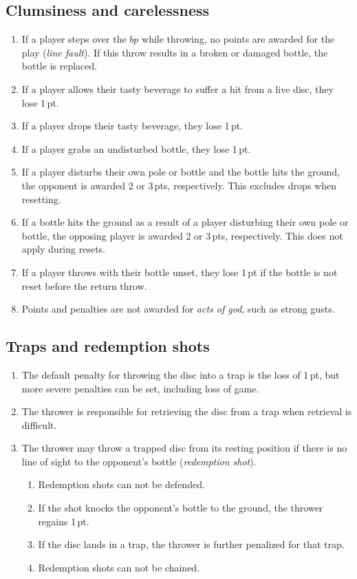 \documentclass[11pt,letterpaper,twocolumn,english,DIV=calc]{scrartcl}
\begin{document}
\subsection{\label{subsec:clumsiness-and-carelessness}Clumsiness and carelessness}
\begin{enumerate}[leftmargin=2.8em, label=\thesubsection.\arabic*]
	\item If a player steps over the $bp$ while throwing, no points are awarded for the play (\emph{line fault}). 
	If this throw results in a broken or damaged bottle, the bottle is replaced.
	
	\item If a player allows their tasty beverage to suffer a hit from a live disc, they lose 1\,pt.
	\item If a player drops their tasty beverage, they lose 1\,pt.
	\item If a player grabs an undisturbed bottle, they lose 1\,pt.
	\item If a player disturbs their own pole or bottle and the bottle hits the ground, the opponent is awarded 2 or 3\,pts, respectively.
	This excludes drops when resetting.
	\item If a bottle hits the ground as a result of a player disturbing their own pole or bottle, the opposing player is awarded 2 or 3\,pts, respectively.
	This does not apply during resets.
	\item If a player throws with their bottle unset, they lose 1\,pt if the bottle is not reset before the return throw.
	\item Points and penalties are not awarded for \emph{acts of god}, such as strong gusts.
\end{enumerate}

\subsection{\label{subsec:traps}Traps and redemption shots}
\begin{enumerate}[leftmargin=2.8em, label=\thesubsection.\arabic*]
	\item The default penalty for throwing the disc into a trap is the loss of 1\,pt, but more severe penalties can be set, including loss of game.
	\item The thrower is responsible for retrieving the disc from a trap when retrieval is difficult.
	\item The thrower may throw a trapped disc from its resting position if there is no line of sight to the opponent's bottle (\emph{redemption shot}). 

	\begin{enumerate}
		\item Redemption shots can not be defended.
		\item If the shot knocks the opponent's bottle to the ground, the thrower regains 1\,pt.
		\item If the disc lands in a trap, the thrower is further penalized for that trap.
		\item Redemption shots can not be chained.
	\end{enumerate}
\end{enumerate}
\end{document}
